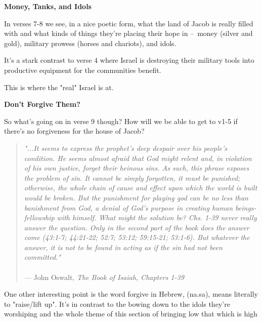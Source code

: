 \documentclass[11pt]{article}
\begin{document}
\vspace{3em}
{\large\bfseries Money, Tanks, and Idols}
\vspace{1em}

In verses 7-8 we see, in a nice poetic form, what the land of Jacob is really filled with
and what kinds of things they're placing their hope in – money (silver and gold), military prowess (horses and chariots), and idols.

{\vspace{1em}}

It's a stark contrast to verse 4 where Israel is destroying their military tools into productive equipment for the communities benefit.

This is where the "real" Israel is at.


\vspace{3em}
{\large\bfseries Don't Forgive Them?}
\vspace{1em}

So what's going on in verse 9 though? How will we be able to get to v1-5 if there's no forgiveness for the house of Jacob?

{\vspace{1em}}

\begin{quote}
\textit{"...It seems to express the prophet's deep despair over his people's condition. He seems almost afraid that God might relent and, in violation of his own justice, forget their heinous sins. As such, this phrase exposes the problem of sin. It cannot be simply forgotten, it must be punished; otherwise, the whole chain of cause and effect upon which the world is built would be broken. But the punishment for playing god can be no less than banishment from God, a denial of God's purpose in creating human beings-fellowship with himself. What might the solution be? Chs. 1-39 never really answer the question. Only in the second part of the book does the answer come (43:1-7; 44:21-22; 52:7; 53:12;
59:15-21; 53:1-6). But whatever the answer, it is not to be found in acting as if the sin had not been committed."}\\\\
\hfill --- John Oswalt, \textit{The Book of Isaiah, Chapters 1-39}
\end{quote}

One other interesting point is the word forgive in Hebrew,  (na.sa), means literally to "raise/lift up". It's in contrast to the bowing down to the idols they're worshiping and the whole theme of this section of bringing low that which is high
\end{document}

